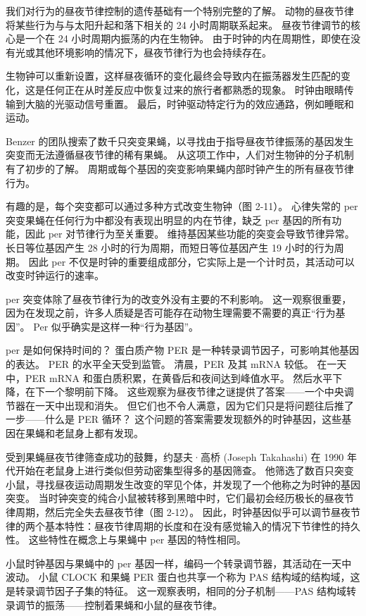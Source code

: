 我们对行为的昼夜节律控制的遗传基础有一个特别完整的了解。 动物的昼夜节律将某些行为与与太阳升起和落下相关的 24 小时周期联系起来。 昼夜节律调节的核心是一个在 24 小时周期内振荡的内在生物钟。 由于时钟的内在周期性，即使在没有光或其他环境影响的情况下，昼夜节律行为也会持续存在。

生物钟可以重新设置，这样昼夜循环的变化最终会导致内在振荡器发生匹配的变化，这是任何正在从时差反应中恢复过来的旅行者都熟悉的现象。 时钟由眼睛传输到大脑的光驱动信号重置。 最后，时钟驱动特定行为的效应通路，例如睡眠和运动。

Benzer 的团队搜索了数千只突变果蝇，以寻找由于指导昼夜节律振荡的基因发生突变而无法遵循昼夜节律的稀有果蝇。 从这项工作中，人们对生物钟的分子机制有了初步的了解。 周期或每个基因的突变影响果蝇内部时钟产生的所有昼夜节律行为。

有趣的是，每个突变都可以通过多种方式改变生物钟（图 2-11）。 心律失常的 per 突变果蝇在任何行为中都没有表现出明显的内在节律，缺乏 per 基因的所有功能，因此 per 对节律行为至关重要。 维持基因某些功能的突变会导致节律异常。 长日等位基因产生 28 小时的行为周期，而短日等位基因产生 19 小时的行为周期。 因此 per 不仅是时钟的重要组成部分，它实际上是一个计时员，其活动可以改变时钟运行的速率。

per 突变体除了昼夜节律行为的改变外没有主要的不利影响。 这一观察很重要，因为在发现之前，许多人质疑是否可能存在动物生理需要不需要的真正“行为基因”。 Per 似乎确实是这样一种“行为基因”。

per 是如何保持时间的？ 蛋白质产物 PER 是一种转录调节因子，可影响其他基因的表达。 PER 的水平全天受到监管。 清晨，PER 及其 mRNA 较低。 在一天中，PER mRNA 和蛋白质积累，在黄昏后和夜间达到峰值水平。 然后水平下降，在下一个黎明前下降。 这些观察为昼夜节律之谜提供了答案——一个中央调节器在一天中出现和消失。 但它们也不令人满意，因为它们只是将问题往后推了一步——什么是 PER 循环？ 这个问题的答案需要发现额外的时钟基因，这些基因在果蝇和老鼠身上都有发现。

受到果蝇昼夜节律筛查成功的鼓舞，约瑟夫·高桥 (Joseph Takahashi) 在 1990 年代开始在老鼠身上进行类似但劳动密集型得多的基因筛查。 他筛选了数百只突变小鼠，寻找昼夜运动周期发生改变的罕见个体，并发现了一个他称之为时钟的基因突变。 当时钟突变的纯合小鼠被转移到黑暗中时，它们最初会经历极长的昼夜节律周期，然后完全失去昼夜节律（图 2-12）。 因此，时钟基因似乎可以调节昼夜节律的两个基本特性：昼夜节律周期的长度和在没有感觉输入的情况下节律性的持久性。 这些特性在概念上与果蝇中 per 基因的特性相同。

小鼠时钟基因与果蝇中的 per 基因一样，编码一个转录调节器，其活动在一天中波动。 小鼠 CLOCK 和果蝇 PER 蛋白也共享一个称为 PAS 结构域的结构域，这是转录调节因子子集的特征。 这一观察表明，相同的分子机制——PAS 结构域转录调节的振荡——控制着果蝇和小鼠的昼夜节律。

